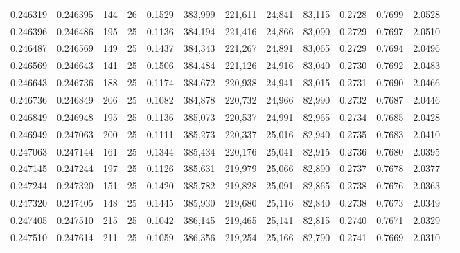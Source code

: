 \begin{tabular}{rrrrrrrrrrrrr}
0.246319 & 0.246395 &   144 &  26 &                                     0.1529 & 383,999 & 221,611 &  24,841 &  83,115 & 0.2728 & 0.7699 & 2.0528 \\
0.246396 & 0.246486 &   195 &  25 &                                     0.1136 & 384,194 & 221,416 &  24,866 &  83,090 & 0.2729 & 0.7697 & 2.0510 \\
0.246487 & 0.246569 &   149 &  25 &                                     0.1437 & 384,343 & 221,267 &  24,891 &  83,065 & 0.2729 & 0.7694 & 2.0496 \\
0.246569 & 0.246643 &   141 &  25 &                                     0.1506 & 384,484 & 221,126 &  24,916 &  83,040 & 0.2730 & 0.7692 & 2.0483 \\
0.246643 & 0.246736 &   188 &  25 &                                     0.1174 & 384,672 & 220,938 &  24,941 &  83,015 & 0.2731 & 0.7690 & 2.0466 \\
0.246736 & 0.246849 &   206 &  25 &                                     0.1082 & 384,878 & 220,732 &  24,966 &  82,990 & 0.2732 & 0.7687 & 2.0446 \\
0.246849 & 0.246948 &   195 &  25 &                                     0.1136 & 385,073 & 220,537 &  24,991 &  82,965 & 0.2734 & 0.7685 & 2.0428 \\
0.246949 & 0.247063 &   200 &  25 &                                     0.1111 & 385,273 & 220,337 &  25,016 &  82,940 & 0.2735 & 0.7683 & 2.0410 \\
0.247063 & 0.247144 &   161 &  25 &                                     0.1344 & 385,434 & 220,176 &  25,041 &  82,915 & 0.2736 & 0.7680 & 2.0395 \\
0.247145 & 0.247244 &   197 &  25 &                                     0.1126 & 385,631 & 219,979 &  25,066 &  82,890 & 0.2737 & 0.7678 & 2.0377 \\
0.247244 & 0.247320 &   151 &  25 &                                     0.1420 & 385,782 & 219,828 &  25,091 &  82,865 & 0.2738 & 0.7676 & 2.0363 \\
0.247320 & 0.247405 &   148 &  25 &                                     0.1445 & 385,930 & 219,680 &  25,116 &  82,840 & 0.2738 & 0.7673 & 2.0349 \\
0.247405 & 0.247510 &   215 &  25 &                                     0.1042 & 386,145 & 219,465 &  25,141 &  82,815 & 0.2740 & 0.7671 & 2.0329 \\
0.247510 & 0.247614 &   211 &  25 &                                     0.1059 & 386,356 & 219,254 &  25,166 &  82,790 & 0.2741 & 0.7669 & 2.0310 \\

\end{tabular}
